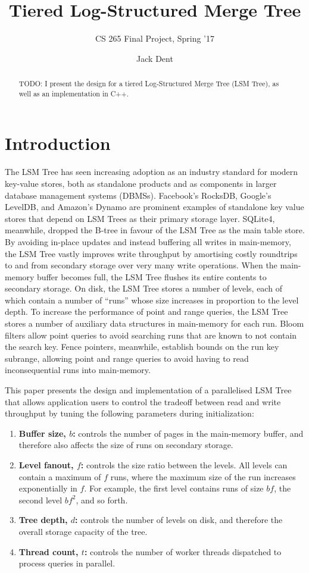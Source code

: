 \documentclass{acm}
\title{Tiered Log-Structured Merge Tree}
\subtitle{CS 265 Final Project, Spring '17}
\author{Jack Dent\\\email{jdent@college.harvard.edu}}
\begin{document}
\maketitle

\begin{abstract}
TODO: I present the design for a tiered Log-Structured Merge Tree (LSM Tree), as well as an implementation in C++. 
\end{abstract}

\section{Introduction}

The LSM Tree has seen increasing adoption as an industry standard for modern key-value stores, both as standalone products and as components in larger database management systems (DBMSs). Facebook's RocksDB, Google's LevelDB, and Amazon's Dynamo are prominent examples of standalone key value stores that depend on LSM Trees as their primary storage layer. SQLite4, meanwhile, dropped the B-tree in favour of the LSM Tree as the main table store. By avoiding in-place updates and instead buffering all writes in main-memory, the LSM Tree vastly improves write throughput by amortising costly roundtrips to and from secondary storage over very many write operations. When the main-memory buffer becomes full, the LSM Tree flushes its entire contents to secondary storage. On disk, the LSM Tree stores a number of levels, each of which contain a number of ``runs'' whose size increases in proportion to the level depth. To increase the performance of point and range queries, the LSM Tree stores a number of auxiliary data structures in main-memory for each run. Bloom filters allow point queries to avoid searching runs that are known to not contain the search key. Fence pointers, meanwhile, establish bounds on the run key subrange, allowing point and range queries to avoid having to read inconsequential runs into main-memory.

This paper presents the design and implementation of a parallelised LSM Tree that allows application users to control the tradeoff between read and write throughput by tuning the following parameters during initialization:

\begin{enumerate}
\item \textbf{Buffer size, $b$:} controls the number of pages in the main-memory buffer, and therefore also affects the size of runs on secondary storage.
\item \textbf{Level fanout, $f$:} controls the size ratio between the levels. All levels can contain a maximum of $f$ runs, where the maximum size of the run increases exponentially in $f$. For example, the first level contains runs of size $bf$, the second level $bf^2$, and so forth.
\item \textbf{Tree depth, $d$:} controls the number of levels on disk, and therefore the overall storage capacity of the tree.
\item \textbf{Thread count, $t$:} controls the number of worker threads dispatched to process queries in parallel.
\end{enumerate}
\end{document}
